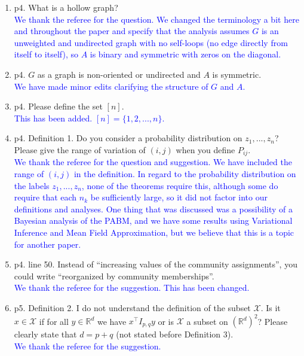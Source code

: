 \documentclass[
]{article}
\begin{document}
\begin{enumerate}
\def\labelenumi{\arabic{enumi}.}
\item
  p4. What is a hollow graph?\\
  \textcolor{blue}{
  We thank the referee for the question. 
  We changed the terminology a bit here and throughout the paper 
  and specify that the analysis assumes $G$ is an unweighted and undirected graph with no self-loops (no edge directly from itself to itself), 
  so $A$ is binary and symmetric with zeros on the diagonal. 
  }
\item
  p4. \(G\) as a graph is non-oriented or undirected and \(A\) is
  symmetric.\\
  \textcolor{blue}{
  We have made minor edits clarifying the structure of $G$ and $A$. 
  }
\item
  p4. Please define the set \([n]\).\\
  \textcolor{blue}{
  This has been added. $[n] = \{1, 2, ..., n\}$. 
  }
\item
  p4. Definition 1. Do you consider a probability distribution on
  \(z_1, ..., z_n\)? Please give the range of variation of \((i, j)\)
  when you define \(P_{ij}\).\\
  \textcolor{blue}{
  We thank the referee for the question and suggestion. 
  We have included the range of $(i, j)$ in the definition. 
  In regard to the probability distribution on the labels $z_1, ..., z_n$, none of the theorems require this, although some do require that each $n_k$ be sufficiently large, so it did not factor into our definitions and analyses. 
  One thing that was discussed was a possibility of a Bayesian analysis of the PABM, and we have some results using Variational Inference and Mean Field Approximation, but we believe that this is a topic for another paper. 
  }
\item
  p4. line 50. Instead of ``increasing values of the community
  assignments'', you could write ``reorganized by community
  memberships''.\\
  \textcolor{blue}{
  We thank the referee for the suggestion. This has been changed.
  }
\item
  p5. Definition 2. I do not understand the definition of the subset
  \(\mathcal{X}\). Is it \(x \in \mathcal{X}\) if for all
  \(y \in \mathbb{R}^d\) we have \(x^\top I_{p,q} y\) or is
  \(\mathcal{X}\) a subset on \((\mathbb{R}^d)^2\)? Please clearly state
  that \(d = p + q\) (not stated before Definition 3).\\
  \textcolor{blue}{
  We thank the referee for the suggestion. 
}
\end{enumerate}
\end{document}
